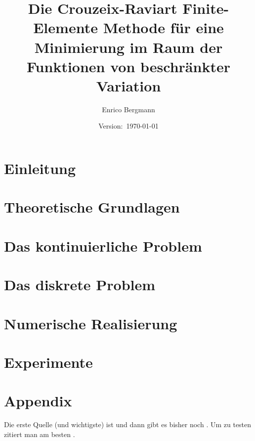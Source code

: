 \documentclass[draft=false,twoside,12pt]{scrreprt}
\title{Die Crouzeix-Raviart Finite-Elemente Methode für eine Minimierung im Raum
der Funktionen von beschränkter Variation}
\author{Enrico Bergmann}
\date{Version:~\today}
\begin{document}
\maketitle
\tableofcontents

\todototoc
\listoftodos

\chapter{Einleitung}


\chapter{Theoretische Grundlagen}


\chapter{Das kontinuierliche Problem}


\chapter{Das diskrete Problem}


\chapter{Numerische Realisierung}
%

\chapter{Experimente}



\appendix
\chapter{Appendix}


Die erste Quelle (und wichtigste) ist \cite{Bar15} und dann gibt es bisher 
noch
\cite[200]{Roc70}.
Um zu testen zitiert man am besten \cite{TestProbe99}.
\end{document}
